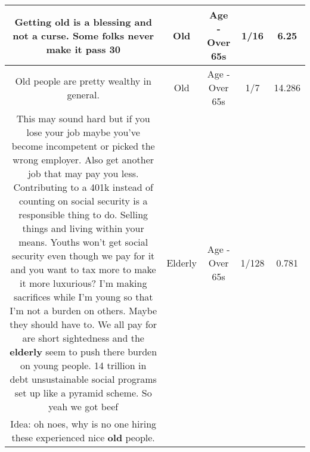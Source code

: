 \documentclass[11pt]{article}
\newlength\mylength
\begin{document}
\begin{center}
\begin{longtable}{|C{.65\mylength}|C{.30\mylength}|C{.12\mylength}|C{.12\mylength}|C{.12\mylength}|}
  \small Getting \textbf{old} is a blessing and not a curse. Some folks never make it pass 30\normalsize   & Old & Age - Over 65s & 1/16 & 6.25 \\  \hline
  \small Old people are pretty wealthy in general.\normalsize   & Old & Age - Over 65s & 1/7 & 14.286 \\  \hline
  \small This may sound hard but if you lose your job maybe you've become incompetent or picked the wrong employer. Also get another job that may pay you less. Contributing to a 401k instead of counting on social security is a responsible thing to do. Selling things and living within your means. Youths won't get social security even though we pay for it and you want to tax more to make it more luxurious? I'm making sacrifices while I'm young so that I'm not a burden on others. Maybe they should have to. We all pay for are short sightedness and the \textbf{elderly} seem to push there burden on young people. 14 trillion in debt unsustainable social programs set up like a pyramid scheme. So yeah we got beef\normalsize   & Elderly & Age - Over 65s & 1/128 & 0.781 \\  \hline
  \small Idea: oh noes, why is no one hiring these experienced nice \textbf{old} people.


\end{longtable}
\end{center}
\end{document}
